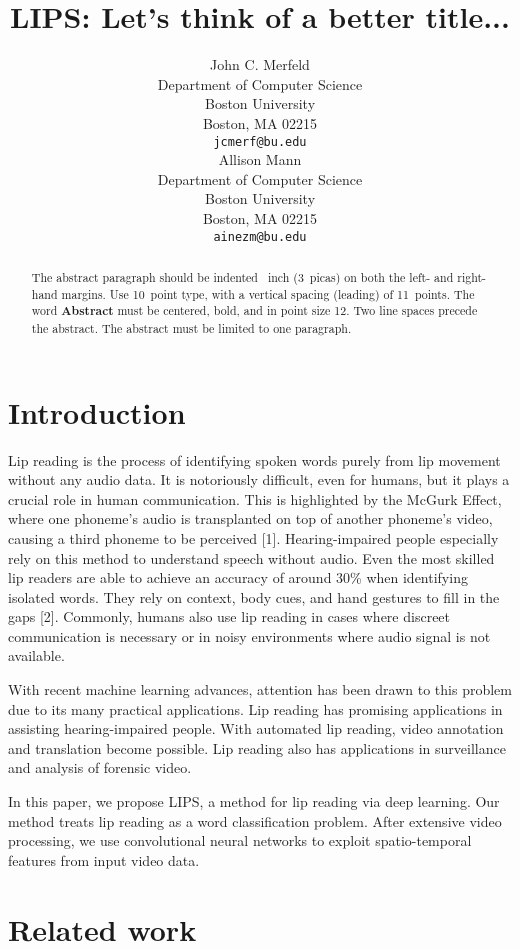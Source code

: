 \documentclass{article}
\title{LIPS: Let's think of a better title...}
\author{%
  John C. Merfeld \\
  Department of Computer Science\\
  Boston University\\
  Boston, MA 02215 \\
  \texttt{jcmerf@bu.edu} \\
	\And
  Allison Mann \\
  Department of Computer Science\\
  Boston University\\
  Boston, MA 02215 \\
  \texttt{ainezm@bu.edu} \\
}
\begin{document}
\maketitle

\begin{abstract}
  The abstract paragraph should be indented ~inch (3~picas) on
  both the left- and right-hand margins. Use 10~point type, with a vertical
  spacing (leading) of 11~points.  The word \textbf{Abstract} must be centered,
  bold, and in point size 12. Two line spaces precede the abstract. The abstract
  must be limited to one paragraph.
\end{abstract}

\section{Introduction}

Lip reading is the process of identifying spoken words purely from lip movement without any audio data. It is notoriously difficult, even for humans, but it plays a crucial role in human communication. This is highlighted by the McGurk Effect, where one phoneme's audio is transplanted on top of another phoneme's video, causing a third phoneme to be perceived [1]. Hearing-impaired people especially rely on this method to understand speech without audio. Even the most skilled lip readers are able to achieve an accuracy of around 30\% when identifying isolated words. They rely on context, body cues, and hand gestures to fill in the gaps [2]. Commonly, humans also use lip reading in cases where discreet communication is necessary or in noisy environments where audio signal is not available.

With recent machine learning advances, attention has been drawn to this problem due to its many practical applications. Lip reading has promising applications in assisting hearing-impaired people. With automated lip reading, video annotation and translation become possible. Lip reading also has applications in surveillance and analysis of forensic video.

In this paper, we propose LIPS, a method for lip reading via deep learning. Our method treats lip reading as a word classification problem. After extensive video processing, we use convolutional neural networks to exploit spatio-temporal features from input video data.

\section{Related work}
\end{document}
